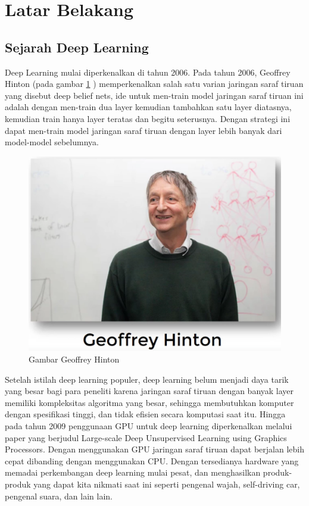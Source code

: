 \section{Latar Belakang}
\subsection{Sejarah Deep Learning}
Deep Learning mulai diperkenalkan di tahun 2006. Pada tahun 2006, Geoffrey Hinton (pada gambar \ref{labelgambar1} ) memperkenalkan salah satu varian jaringan saraf tiruan yang disebut deep belief nets, ide untuk men-train model jaringan saraf tiruan ini adalah dengan men-train dua layer kemudian tambahkan satu layer diatasnya, kemudian train hanya layer teratas dan begitu seterusnya. Dengan strategi ini dapat men-train model jaringan saraf tiruan dengan layer lebih banyak dari model-model sebelumnya. 

\begin{figure}[h!]
	\centering
	\includegraphics[scale=0.4]{figures/7.PNG}
	\caption{Gambar Geoffrey Hinton}
	\label{labelgambar1}
	\end{figure}

Setelah istilah deep learning populer, deep learning belum menjadi daya tarik yang besar bagi para peneliti karena jaringan saraf tiruan dengan banyak layer memiliki kompleksitas algoritma yang besar, sehingga membutuhkan komputer dengan spesifikasi tinggi, dan tidak efisien secara komputasi saat itu. Hingga pada tahun 2009 penggunaan GPU untuk deep learning diperkenalkan melalui paper yang berjudul Large-scale Deep Unsupervised Learning using Graphics Processors. Dengan menggunakan GPU jaringan saraf tiruan dapat berjalan lebih cepat dibanding dengan menggunakan CPU. Dengan tersedianya hardware yang memadai perkembangan deep learning mulai pesat, dan menghasilkan produk-produk yang dapat kita nikmati saat ini seperti pengenal wajah, self-driving car, pengenal suara, dan lain lain.


